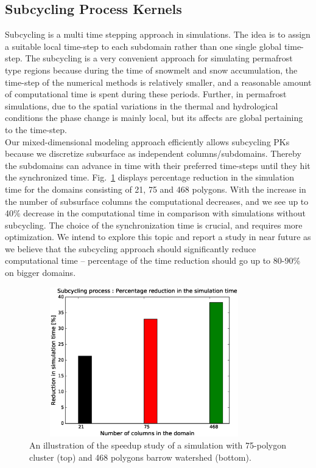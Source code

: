 \documentclass[review]{elsarticle}
\begin{document}
\subsection{Subcycling Process Kernels}
Subcycling is a multi time stepping approach in simulations. The idea is to assign a suitable local time-step to each subdomain rather than one single global time-step. The subcycling is a very convenient approach for simulating permafrost type regions because during the time of snowmelt and snow accumulation, the time-step of the numerical methods is relatively smaller, and a reasonable amount of computational time is spent during these periods. Further, in permafrost simulations, due to the spatial variations in the thermal and hydrological conditions the phase change is mainly local, but its affects are global pertaining to the time-step. \\
Our mixed-dimensional modeling approach efficiently allows subcycling PKs because we discretize subsurface as independent columns/subdomains. Thereby the subdomains can advance in time with their preferred time-steps until they hit the synchronized time. Fig.~\ref{subcycle-time-reduciton} displays percentage reduction in the simulation time for the domains consisting of 21, 75 and 468 polygons. With the increase in the number of subsurface columns the computational decreases, and we see up to 40\% decrease in the computational time in comparison with simulations without subcycling. The choice of the synchronization time is crucial, and requires more optimization. We intend to explore this topic and report a study in near future as we believe that the subcycling approach should significantly reduce computational time -- percentage of the time reduction should go up to 80-90\% on bigger domains.

\begin{figure}[!htpb]
\centering
\includegraphics[height = 6.5cm, width=10cm]{figures/subcycle-time-reduciton.eps}
\caption{An illustration of the speedup study of a simulation with 75-polygon cluster (top) and 468 polygons barrow watershed (bottom).}
\label{subcycle-time-reduciton}
\end{figure}
\end{document}

